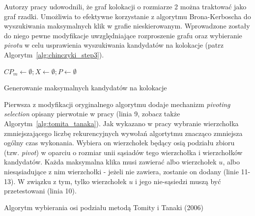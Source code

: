 \documentclass[12pt]{article}
\begin{document}
Autorzy pracy \cite{chinczyki} udowodnili, że graf kolokacji o rozmiarze 2 można traktować jako graf rzadki. Umożliwia to efektywne korzystanie z algorytmu Brona-Kerboscha \cite{kerbosz} do wyszukiwania maksymalnych klik w grafie nieskierowanym. Wprowadzone zostały do niego pewne modyfikacje uwzględniające rozproszenie grafu oraz wybieranie \textit{pivotu} w celu usprawienia wyszukiwania kandydatów na kolokacje (patrz Algorytm~\ref{alg:chinczyki_step3}).

\begin{algorithm}

$CP_{m} \leftarrow \emptyset; X \leftarrow \emptyset; P \leftarrow \emptyset$\;

\caption{Generowanie maksymalnych kandydatów na kolokacje}
\label{alg:chinczyki_step3}
\end{algorithm}

Pierwsza z modyfikacji oryginalnego algorytmu dodaje mechanizm \textit{pivoting selection} opisany pierwotnie w pracy \cite{pivot} (linia 9, zobacz także Algorytm~\ref{alg:tomita_tanaka}). Jak wykazano w pracy \cite{pivot2} wybranie wierzchołka zmniejszającego liczbę rekurencyjnych wywołań algortytmu znacząco zmniejsza ogólny czas wykonania. Wybiera on wierzchołek będący osią podziału zbioru (tzw. \textit{pivot}) w oparciu o rozmiar unii sąsiadów tego wierzchołka i wierzchołków kandydatów. Każda maksymalna klika musi zawierać albo wierzchołek $ u $, albo niesąsiadujące z nim wierzchołki - jeżeli nie zawiera, zostanie on dodany (linie 11-13). W związku z tym, tylko wierzchołek $ u $ i jego nie-sąsiedzi muszą być przetestowani (linia 10).

\begin{algorithm}

\caption{Algorytm wybierania osi podziału metodą Tomity i Tanaki (2006)}
\label{alg:tomita_tanaka}
\end{algorithm}
\end{document}
